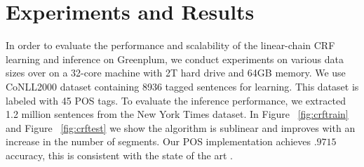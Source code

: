 \documentclass[11pt,letterpaper]{article}
\begin{document}






\section{Experiments and Results}
In order to evaluate the performance and scalability of the linear-chain CRF learning and inference on Greenplum,
we conduct experiments on various data sizes over on a 32-core machine with 2T hard drive and 64GB memory.
We use CoNLL2000 dataset containing 8936 tagged sentences for learning. 
This dataset is labeled with 45 POS tags.
To evaluate the inference performance, we extracted 1.2 million sentences from the New York Times dataset. 
In Figure ~\ref{fig:crftrain} and Figure ~\ref{fig:crftest} we show the algorithm is sublinear and improves with an increase in the number of segments.
Our POS implementation achieves $.9715$ accuracy, this is consistent with the state of the art \cite{Manning:2011:PT9:1964799.1964816}.
\end{document}
